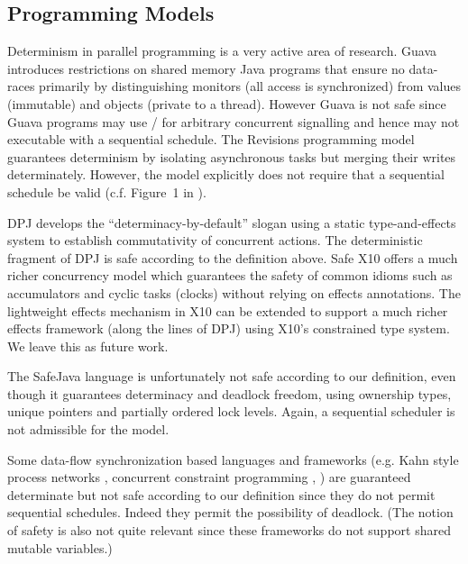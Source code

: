 \label{sec:related}

\subsection{Programming Models} 
Determinism in parallel programming is a very active area of research.
Guava \cite{guava} introduces restrictions on shared memory Java
programs that ensure no data-races primarily by distinguishing
monitors (all access is synchronized) from values (immutable) and
objects (private to a thread). However Guava is not safe since Guava
programs may use / for arbitrary concurrent
signalling and hence may not executable with a sequential
schedule. The Revisions programming model \cite{Revisions} guarantees
determinism by isolating asynchronous tasks but merging their writes
determinately. However, the model explicitly does not require that
a sequential schedule be valid (c.f. Figure~1 in \cite{Revisions}).


DPJ develops the ``determinacy-by-default'' slogan using a static
type-and-effects system to establish commutativity of concurrent
actions.  The deterministic fragment of DPJ is safe according to the
definition above. Safe X10 offers a much richer concurrency model
which guarantees the safety of common idioms such as accumulators and
cyclic tasks (clocks) without relying on effects annotations. The
lightweight effects mechanism in X10 can be extended to support a much
richer effects framework (along the lines of DPJ) using X10's
constrained type system.  We leave this as future work.

The SafeJava language \cite{Rinard04safejava:a} is unfortunately not safe
according to our definition, even though it guarantees determinacy and
deadlock freedom, using ownership types, unique pointers and partially
ordered lock levels. Again, a sequential scheduler is not admissible
for the model.

Some data-flow synchronization based languages and frameworks (e.g.{}
Kahn style process networks \cite{kahn1974semantics}, concurrent
constraint programming \cite{saraswat1993concurrent}, \cite{SHIM}) are guaranteed
determinate but not safe according to our definition since they do not
permit sequential schedules. Indeed they permit the possibility of
deadlock. (The notion of safety is also not quite relevant since these
frameworks do not support shared mutable variables.)

